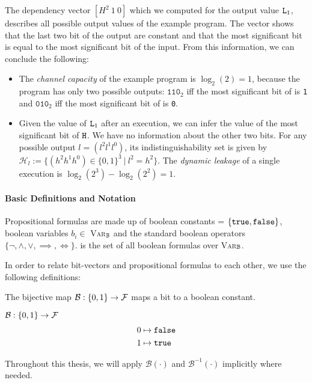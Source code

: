 The dependency vector $[H^2 \: 1 \: 0]$ which we computed for the output value $\mathtt{L}_1$, describes all possible output values of the example program. The vector shows that the last two bit of the output are constant and that the most significant bit is equal to the most significant bit of the input. From this information, we can conclude the following:
\begin{itemize}
    \item The \emph{channel capacity} of the example program is $\log_2(2) = 1$, because the program has only two possible outputs: $\mathtt{110}_2$ iff the most significant bit of \In is \texttt{1} and $\mathtt{010}_2$ iff the most significant bit of \In is \texttt{0}.
    \item Given the value of $\mathtt{L}_1$ after an execution, we can infer the value of the most significant bit of $\mathtt{H}$. We have no information about the other two bits. For any possible output $l = (l^2 l^1 l^0)$, its indistinguishability set is given by $\mathcal{H}_l := \{ (h^2 h^1 h^0) \in \{0, 1\}^3 \: | \: l^2 = h^2\}$. The \emph{dynamic leakage} of a single execution is $\log_2(2^3) - \log_2(2^2) = 1$.
\end{itemize}

\paragraph{Basic Definitions and Notation}
Propositional formulas are made up of boolean constants \bool \: = $\{ \mathtt{true}, \mathtt{false} \}$, boolean variables $b_i \in $ \textsc{Var}$_{\mathbb{B}}$ and the standard boolean operators $\{ \lnot, \land, \lor, \implies, \iff \}$. \: \bform{} is the set of all boolean formulas over \textsc{Var}$_{\mathbb{B}}$.

In order to relate bit-vectors and propositional formulas to each other, we use the following definitions:

\begin{definition}\label{def:b}
The bijective map $\mathcal{B}: \{0, 1\} \to  \mathcal{F}$ maps a bit to a boolean constant.
    \begin{center}
    $\mathcal{B}: \{0, 1\} \to \mathcal{F}$
    \begin{align*}
        0 &\mapsto \mathtt{false}\\
        1 &\mapsto \mathtt{true}
    \end{align*}
    \end{center}
Throughout this thesis, we will apply $\mathcal{B}(\cdot)$ and $\mathcal{B}^{-1}(\cdot)$ implicitly where needed.
\end{definition}

